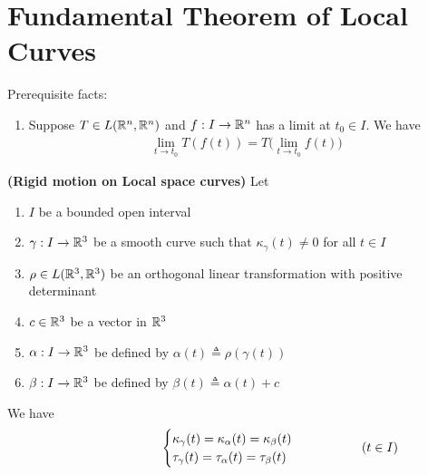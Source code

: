 \documentclass{report}
\begin{document}
\section{Fundamental Theorem of Local Curves}
\begin{mdframed}
Prerequisite facts:
\begin{enumerate}[label=(\alph*)]
  \item Suppose $T\in L(\mathbb{R}^n,\mathbb{R}^n)$ and $f:I\rightarrow \mathbb{R}^n$ has a limit at $t_0\in I$. We have 
    \begin{align*}
    \lim_{t\to t_0 } T (f(t))=T\big(\lim_{t\to t_0}f(t) \big)
    \end{align*}
\end{enumerate}
\end{mdframed}
\begin{theorem}
\textbf{(Rigid motion on Local space curves)} Let 
\begin{enumerate}[label=(\alph*)]
  \item $I$ be a bounded open interval 
  \item $\gamma : I \rightarrow \mathbb{R}^3$ be a smooth curve such that $\kappa_\gamma (t)\neq 0$ for all $t \in I$ 
  \item $\rho\in L(\mathbb{R}^3,\mathbb{R}^3)$ be an orthogonal linear transformation with positive determinant 
  \item $c\in\mathbb{R}^3$ be a vector in $\mathbb{R}^3$
  \item $\alpha :I\rightarrow \mathbb{R}^3$ be defined by $\alpha(t) \triangleq \rho(\gamma(t)) $
  \item $\beta :I\rightarrow \mathbb{R}^3$ be defined by $\beta(t) \triangleq \alpha(t) + c $
\end{enumerate}
We have 
\begin{align*}
\hspace{2.5cm}\begin{cases}
  \kappa_\gamma (t)=\kappa_\alpha (t)=\kappa_\beta (t)\\
  \tau_\gamma (t)=\tau_\alpha (t)=\tau_\beta (t)
\end{cases}\hspace{1.5cm}(t \in I)
\end{align*}
\end{theorem}
\end{document}
